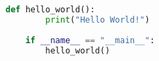 \label{code}
\begin{lstlisting}[language=Python, caption=Code of the Programm, escapechar=|]
    def hello_world():
        print("Hello World!")
    
    if __name__ == "__main__":
        hello_world()
\end{lstlisting}